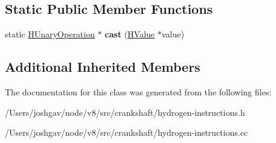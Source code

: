\subsection*{Static Public Member Functions}
\begin{DoxyCompactItemize}
\item 
static \hyperlink{classv8_1_1internal_1_1_h_unary_operation}{H\+Unary\+Operation} $\ast$ {\bfseries cast} (\hyperlink{classv8_1_1internal_1_1_h_value}{H\+Value} $\ast$value)\hypertarget{classv8_1_1internal_1_1_h_unary_operation_aa5104f29be9e17219c6032893ac4c468}{}\label{classv8_1_1internal_1_1_h_unary_operation_aa5104f29be9e17219c6032893ac4c468}

\end{DoxyCompactItemize}
\subsection*{Additional Inherited Members}


The documentation for this class was generated from the following files\+:\begin{DoxyCompactItemize}
\item 
/\+Users/joshgav/node/v8/src/crankshaft/hydrogen-\/instructions.\+h\item 
/\+Users/joshgav/node/v8/src/crankshaft/hydrogen-\/instructions.\+cc\end{DoxyCompactItemize}
